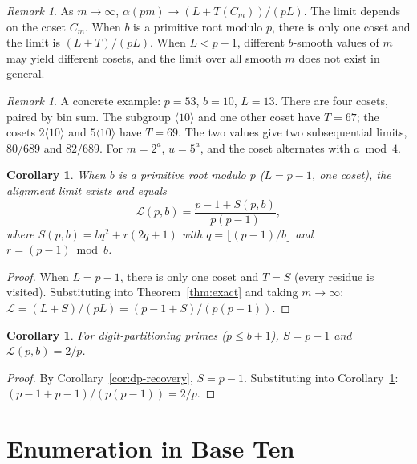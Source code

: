 \documentclass[12pt]{amsart}
\newtheorem{corollary}[theorem]{Corollary}
\theoremstyle{definition}
\theoremstyle{remark}
\newtheorem{remark}[theorem]{Remark}
\begin{document}
\begin{remark}
As $m \to \infty$, $\alpha(pm) \to (L + T(C_m))/(pL)$.
The limit depends on the coset $C_m$. When $b$ is a
primitive root modulo $p$, there is only one coset and
the limit is $(L + T)/(pL)$. When $L < p{-}1$, different
$b$-smooth values of $m$ may yield different cosets, and
the limit over all smooth $m$ does not exist in general.
\end{remark}

\begin{remark}
A concrete example: $p = 53$, $b = 10$, $L = 13$. There
are four cosets, paired by bin sum. The subgroup
$\langle 10 \rangle$ and one other coset have $T = 67$;
the cosets $2\langle 10 \rangle$ and $5\langle 10 \rangle$
have $T = 69$. The two values give two subsequential
limits, $80/689$ and $82/689$. For $m = 2^a$, $u = 5^a$,
and the coset alternates with $a \bmod 4$.
\end{remark}

\begin{corollary}\label{cor:closed-form}
When $b$ is a primitive root modulo $p$
($L = p{-}1$, one coset), the alignment limit exists
and equals
\[
\mathcal{L}(p,b) = \frac{p - 1 + S(p,b)}{p(p - 1)},
\]
where $S(p,b) = bq^2 + r(2q{+}1)$ with
$q = \lfloor(p{-}1)/b\rfloor$ and $r = (p{-}1) \bmod b$.
\end{corollary}

\begin{proof}
When $L = p{-}1$, there is only one coset and
$T = S$ (every residue is visited). Substituting into
Theorem~\ref{thm:exact} and taking $m \to \infty$:
$\mathcal{L} = (L + S)/(pL)
= (p{-}1+S)/(p(p{-}1))$.
\end{proof}

\begin{corollary}\label{cor:dp-limit}
For digit-partitioning primes ($p \le b{+}1$),
$S = p{-}1$ and $\mathcal{L}(p,b) = 2/p$.
\end{corollary}

\begin{proof}
By Corollary~\ref{cor:dp-recovery}, $S = p{-}1$.
Substituting into Corollary~\ref{cor:closed-form}:
$(p{-}1 + p{-}1)/(p(p{-}1)) = 2/p$.
\end{proof}

\section{Enumeration in Base Ten}
\end{document}
